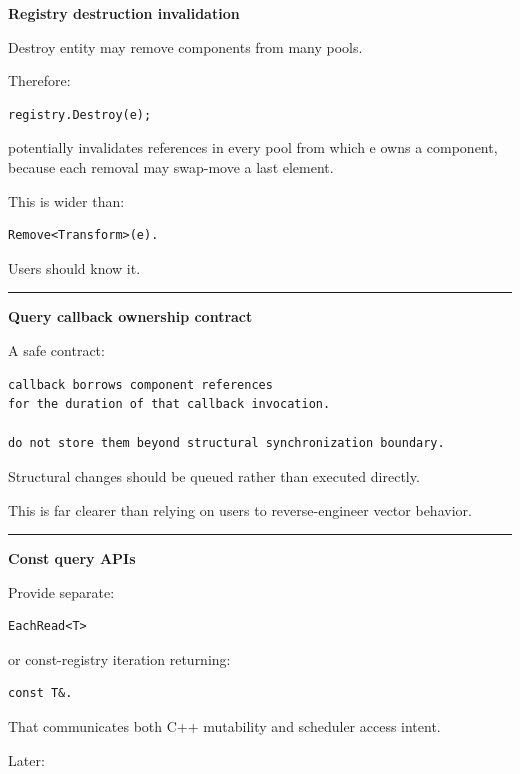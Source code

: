 \textbf{Registry destruction invalidation}

Destroy entity may remove components from many pools.

Therefore:

\begin{verbatim}
registry.Destroy(e);
\end{verbatim}

potentially invalidates references in every pool from which e owns a component, because each removal may swap-move a last element.

This is wider than:

\begin{verbatim}
Remove<Transform>(e).
\end{verbatim}

Users should know it.

\begin{center}\rule{0.5\linewidth}{0.5pt}\end{center}

\textbf{Query callback ownership contract}

A safe contract:

\begin{verbatim}
callback borrows component references
for the duration of that callback invocation.

do not store them beyond structural synchronization boundary.
\end{verbatim}

Structural changes should be queued rather than executed directly.

This is far clearer than relying on users to reverse-engineer vector behavior.

\begin{center}\rule{0.5\linewidth}{0.5pt}\end{center}

\textbf{Const query APIs}

Provide separate:

\begin{verbatim}
EachRead<T>
\end{verbatim}

or const-registry iteration returning:

\begin{verbatim}
const T&.
\end{verbatim}

That communicates both C++ mutability and scheduler access intent.

Later:

